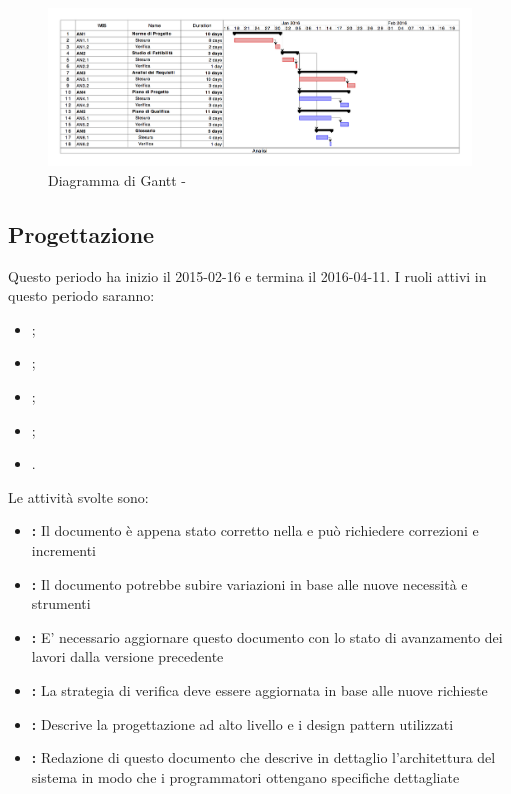 \documentclass[12pt,a4paper]{article}
\begin{document}
\begin{center}
	\begin{figure}[H]
		\centering
		\includegraphics[width=\textwidth]{../img/ganttAnalisi.png}
		\caption{Diagramma di Gantt - \FA{}}
	\end{figure}
\end{center}

\newpage
\subsection{Progettazione}
Questo periodo ha inizio il 2015-02-16 e termina il 2016-04-11. I ruoli attivi in questo periodo saranno:

\begin{itemize}
	\item \PM{};
	\item \AM{};
	\item \AN{};
	\item \PR{};
	\item \VR{}.
\end{itemize}

Le attività svolte sono:

\begin{itemize}
	\item \textbf{\AdR{}:} 
	Il documento è appena stato corretto nella \RR{} e può richiedere correzioni e incrementi
	\item \textbf{\NdP{}:}
	Il documento potrebbe subire variazioni in base alle nuove necessità e strumenti
	\item \textbf{\PdP{}:}
	E' necessario aggiornare questo documento con lo stato di avanzamento dei lavori dalla versione precedente
	\item \textbf{\PdQ{}:}
	La strategia di verifica deve essere aggiornata in base alle nuove richieste
	\item \textbf{\ST{}:}
	Descrive la progettazione ad alto livello e i design pattern utilizzati
	\item \textbf{\DP{}:}
	Redazione di questo documento che descrive in dettaglio l'architettura del sistema in modo che i programmatori ottengano specifiche dettagliate
\end{itemize}
\end{document}
